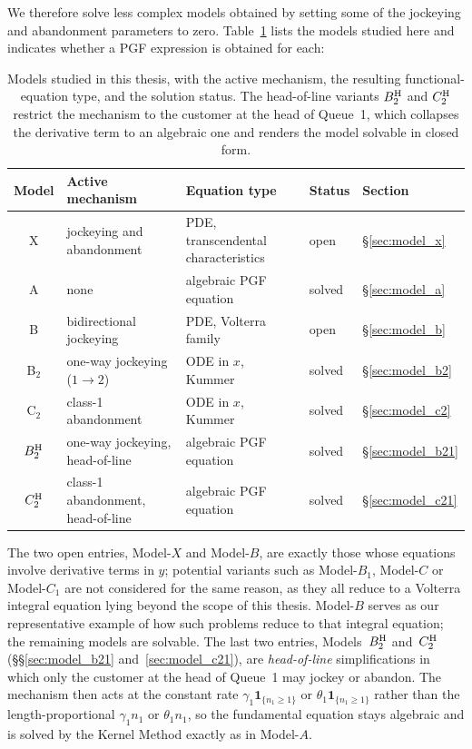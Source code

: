 We therefore solve less complex models obtained by setting some of the jockeying and abandonment parameters to zero. Table~\ref{tab:model_overview_intro} lists the models studied here and indicates whether a PGF expression is obtained for each:
\begin{table}[H]
\centering
\renewcommand{\arraystretch}{1.3}
\footnotesize
    \begin{tabular}{cllll}
        \hline
            \textbf{Model} & \textbf{Active mechanism} & \textbf{Equation type} & \textbf{Status} & \textbf{Section} \\
            \hline
            X     & jockeying and abandonment               & PDE, transcendental characteristics & open & \S\ref{sec:model_x} \\
            A     & none                                    & algebraic PGF equation & solved & \S\ref{sec:model_a} \\
            B     & bidirectional jockeying                 & PDE, Volterra family   & open & \S\ref{sec:model_b} \\
            B$_2$   & one-way jockeying ($1\to2$)           & ODE in $x$, Kummer     & solved & \S\ref{sec:model_b2} \\
            C$_2$   & class-1 abandonment                   & ODE in $x$, Kummer     & solved & \S\ref{sec:model_c2} \\
            $B_2^{\mathrm{H}}$ & one-way jockeying, head-of-line       & algebraic PGF equation & solved & \S\ref{sec:model_b21} \\
            $C_2^{\mathrm{H}}$ & class-1 abandonment, head-of-line     & algebraic PGF equation & solved & \S\ref{sec:model_c21} \\
        \hline
    \end{tabular}
    \caption{Models studied in this thesis, with the active mechanism, the resulting functional-equation type, and the solution status. The head-of-line variants $B_2^{\mathrm{H}}$ and $C_2^{\mathrm{H}}$ restrict the mechanism to the customer at the head of Queue~1, which
collapses the derivative term to an algebraic one and renders the model solvable in closed
form.}
    \label{tab:model_overview_intro}
\end{table}
The two open entries, Model-$X$ and Model-$B$, are exactly those whose equations involve derivative terms in $y$; potential variants such as Model-$B_1$, Model-$C$ or Model-$C_1$ are not considered for the same reason, as they all reduce to a Volterra integral equation lying beyond the scope of this thesis. Model-$B$ serves as our representative example of how such problems reduce to that integral equation; the remaining models are solvable. The last two entries, Models~$B_2^{\mathrm{H}}$ and~$C_2^{\mathrm{H}}$ (\S\S\ref{sec:model_b21} and~\ref{sec:model_c21}), are \emph{head-of-line} simplifications in which only the customer at the head of Queue~1 may jockey or abandon. The mechanism then acts at the constant rate $\gamma_1\mathbf 1_{\{n_1\ge1\}}$ or $\theta_1\mathbf 1_{\{n_1\ge1\}}$ rather than the length-proportional $\gamma_1 n_1$ or $\theta_1 n_1$, so the fundamental equation stays algebraic and is solved by the Kernel Method exactly as in Model-$A$.

